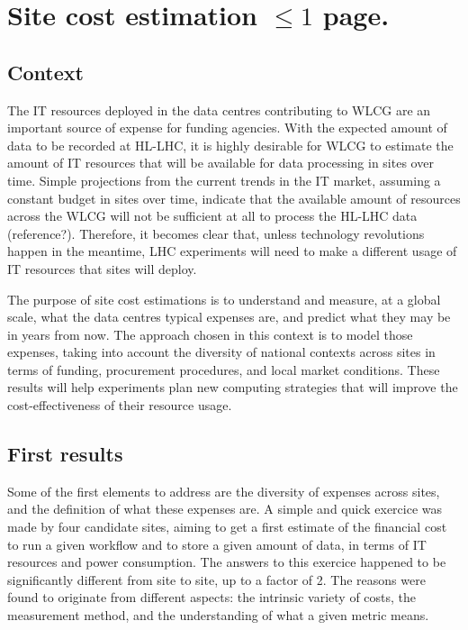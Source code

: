 \section{Site cost estimation $\leq 1$ page.}

\subsection{Context}
The IT resources deployed in the data centres contributing to WLCG are an important source of expense for funding agencies.
With the expected amount of data to be recorded at HL-LHC, it is highly desirable for WLCG to estimate the
amount of IT resources that will be available for data processing in sites over time.
Simple projections from the current trends in the IT market, assuming a constant budget in sites over time, indicate that
the available amount of resources across the WLCG will not be sufficient at all to process the HL-LHC data (reference?).
Therefore, it becomes clear that, unless technology revolutions happen in the meantime,
LHC experiments will need to make a different usage of IT resources that sites will deploy.

The purpose of site cost estimations is to understand and measure, at a global scale,
what the data centres typical expenses are, and predict what they may be in years from now.
The approach chosen in this context is to model those expenses, taking into account the diversity of national contexts
across sites in terms of funding, procurement procedures, and local market conditions.
These results will help experiments plan new computing strategies that
will improve the cost-effectiveness of their resource usage.

\subsection{First results}

Some of the first elements to address are the diversity of expenses across sites, and the definition of what these
expenses are.
A simple and quick exercice was made by four candidate sites, aiming to get a first estimate of the financial cost to run
a given workflow and to store a given amount of data, in terms of IT resources and power consumption.
The answers to this exercice happened to be significantly different from site to site, up to a factor of 2.
The reasons were found to originate from different aspects: the intrinsic variety of costs, the measurement method, and
the understanding of what a given metric means.

